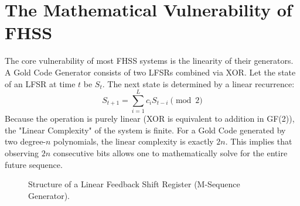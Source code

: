 \documentclass[12pt,a4paper]{report}
\theoremstyle{plain}
\begin{document}
\section{The Mathematical Vulnerability of FHSS}
The core vulnerability of most FHSS systems is the linearity of their generators. A Gold Code Generator consists of two LFSRs combined via XOR.
Let the state of an LFSR at time $t$ be $S_t$. The next state is determined by a linear recurrence:
\begin{equation}
    S_{t+1} = \sum_{i=1}^{L} c_i S_{t-i} \pmod 2
\end{equation}
Because the operation is purely linear (XOR is equivalent to addition in GF(2)), the "Linear Complexity" of the system is finite. For a Gold Code generated by two degree-$n$ polynomials, the linear complexity is exactly $2n$. This implies that observing $2n$ consecutive bits allows one to mathematically solve for the entire future sequence.

\begin{figure}[H]
    \centering
    \caption{Structure of a Linear Feedback Shift Register (M-Sequence Generator).}
    \label{fig:lfsr}
\end{figure}
\end{document}
